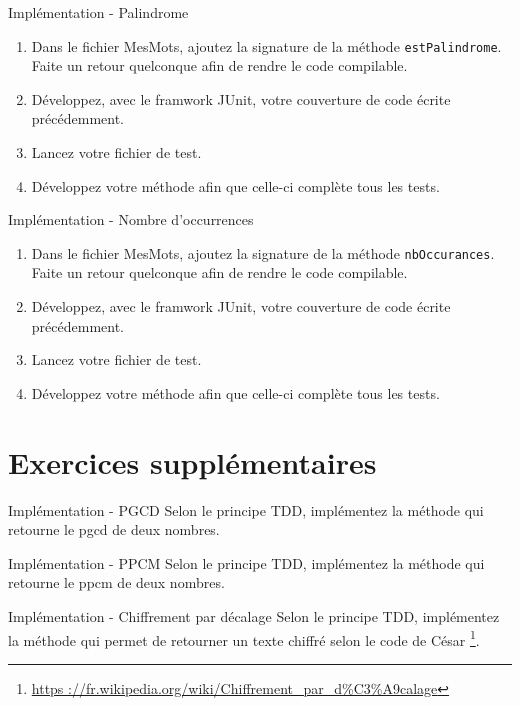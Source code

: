 \documentclass[a4paper,11pt]{style-esi/td}
\begin{document}
	\begin{Exercice}{Implémentation - Palindrome}
		\vspace{-1em}
		\begin{enumerate}
			\item Dans le fichier MesMots, ajoutez la signature de la méthode \texttt{estPalindrome}. Faite un retour quelconque afin de rendre le code compilable.
			\item Développez, avec le framwork JUnit, votre couverture de code écrite précédemment.
			\item Lancez votre fichier de test.
			\item Développez votre méthode afin que celle-ci complète tous les tests.
		\end{enumerate}
	\end{Exercice}

	\begin{Exercice}{Implémentation - Nombre d’occurrences}
		\vspace{-1em}
		\begin{enumerate}
			\item Dans le fichier MesMots, ajoutez la signature de la méthode \texttt{nbOccurances}. Faite un retour quelconque afin de rendre le code compilable.
			\item Développez, avec le framwork JUnit, votre couverture de code écrite précédemment.
			\item Lancez votre fichier de test.
			\item Développez votre méthode afin que celle-ci complète tous les tests.
		\end{enumerate}
		
	\end{Exercice}




\section{Exercices supplémentaires}
	\begin{Exercice}{Implémentation - PGCD}
		Selon le principe TDD, implémentez la méthode  qui retourne le pgcd de deux nombres.
	\end{Exercice}

	\begin{Exercice}{Implémentation - PPCM}
		Selon le principe TDD, implémentez la méthode  qui retourne le ppcm de deux nombres.
	\end{Exercice}

	\begin{Exercice}{Implémentation - Chiffrement par décalage}
		Selon le principe TDD, implémentez la méthode  qui permet de retourner un texte chiffré selon le code de César%
		\footnote{%
			\url{https ://fr.wikipedia.org/wiki/Chiffrement\_par\_d\%C3\%A9calage}
		}.
		
	\end{Exercice}
\end{document}
